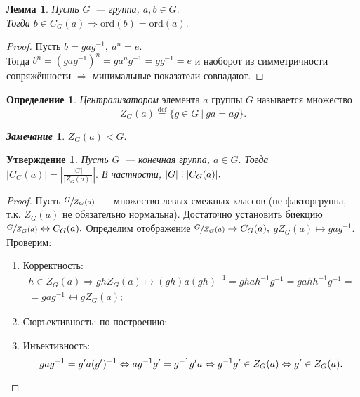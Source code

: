 \documentclass[a4paper, 14pt]{extarticle}
\newcommand{\deq}{\stackrel{\mathrm{def}}{=}}
\newcommand{\ord}{\mathrm{ord}}
\DeclareRobustCommand{\divby}{%
	\mathrel{\text{\vbox{\baselineskip.65ex\lineskiplimit0pt\hbox{.}\hbox{.}\hbox{.}}}}%
}
\theoremstyle{definition}
\newtheorem*{remark}{\textit{Замечание}}
\newtheorem{definition}{Определение}
\theoremstyle{plain}
\numberwithin{theorem}{section}
\numberwithin{definition}{section}
\newtheorem{statement}{Утверждение}
\numberwithin{statement}{section}
\newtheorem{lemma}{Лемма}
\numberwithin{lemma}{section}
\numberwithin{consequence}{section}
\begin{document}
        \begin{lemma}
            Пусть $G$~--- группа, ${a,b \in G.}$ \\
            Тогда ${b \in C_G(a) \Rightarrow \ord(b) = \ord(a).}$
        \end{lemma}
        \begin{proof}
            Пусть ${b = gag^{-1}, \ a^n = e.}$ \\
            Тогда ${b^n = (gag^{-1})^n = ga^ng^{-1} = gg^{-1} = e}$ и наоборот из симметричности сопряжённости $\Rightarrow$ минимальные показатели совпадают.
        \end{proof}
        \begin{definition}
            \textit{Централизатором} элемента $a$ группы $G$ называется множество
            \begin{equation*}
                Z_G(a) \deq \{g \in G \ | \ ga = ag\}.
            \end{equation*}
        \end{definition}
        \begin{remark}
            ${Z_G(a) < G.}$
        \end{remark}
        \newpage
        \begin{statement}
            Пусть $G$~--- конечная группа, ${a \in G.}$ Тогда ${|C_G(a)| = |\frac{|G|}{|Z_G(a)|}|.}$ В частности, ${|G| \divby |C_G(a)|.}$
        \end{statement}
        \begin{proof}
            Пусть $\sfrac{G}{Z_G(a)}$~--- множество левых смежных классов (не факторгруппа, т.к. ${Z_G(a)}$ не обязательно нормальна). Достаточно установить биекцию ${\sfrac{G}{Z_G(a)} \leftrightarrow C_G(a).}$\newline
            Определим отображение ${\sfrac{G}{Z_G(a)} \rightarrow C_G(a),}$ ${gZ_G(a) \mapsto gag^{-1}.}$ Проверим:
            \begin{enumerate}
            \setlength\itemsep{0.1em}
                \item Корректность:
                \begin{equation*}
                    \begin{gathered}
                        h \in Z_G(a) \Rightarrow ghZ_G(a) \mapsto (gh)a(gh)^{-1} = ghah^{-1}g^{-1} = gahh^{-1}g^{-1} = \\
                        = gag^{-1} \mapsfrom gZ_G(a);
                    \end{gathered}
                \end{equation*}
                \item Сюръективность: по построению;
                \item Инъективность:\
                \begin{equation*}
                    gag^{-1} = g'a(g')^{-1} \Leftrightarrow ag^{-1}g' = g^{-1}g'a \Leftrightarrow g^{-1}g' \in Z_G(a) \Leftrightarrow g' \in Z_G(a). \qedhere
                \end{equation*}
            \end{enumerate}
        \end{proof}
	\newpage
\end{document}
